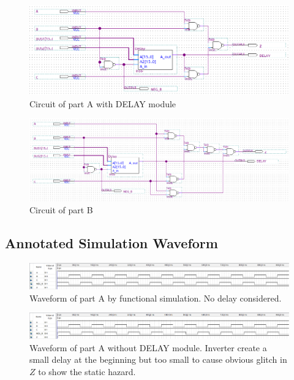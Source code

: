 \documentclass[12pt]{article}
\begin{document}
\begin{figure}[H]
    \centering
    \includegraphics[scale=0.5]{lab1_partADelay.png}
    \caption{Circuit of part A with DELAY module}
\end{figure}

\begin{figure}[H]
    \centering
    \includegraphics[scale=0.4]{lab1_partB.png}
    \caption{Circuit of part B}
\end{figure}

\subsection{\textbf{Annotated Simulation Waveform}}
\begin{figure}[H]
    \centering
    \includegraphics[width=18cm]{lab1_partA_func_sim.png}
    \caption{Waveform of part A by functional simulation. No delay considered.}
\end{figure}

\begin{figure}[H]
    \centering
    \includegraphics[width=18cm]{lab1_partA_waveform.png}
    \caption{Waveform of part A without DELAY module. Inverter create a small delay at the beginning but too small to cause obvious glitch in $Z$ to show the static hazard.}
\end{figure}
\end{document}
